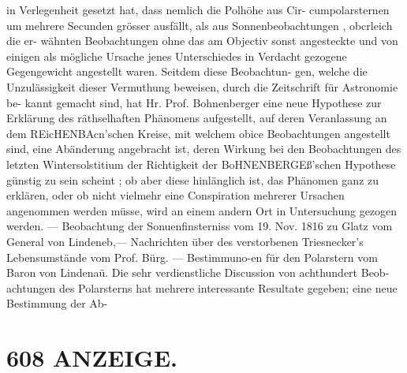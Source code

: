 \documentclass[12pt,a4paper]{article}
\begin{document}
{{{{{{{{in  Verlegenheit  gesetzt  hat,  dass  nemlich  die  Polhöhe  aus  Cir- cumpolarsternen  um  mehrere  Secunden  grösser  ausfällt,  als  aus  Sonnenbeobachtungen  ,  obcrleich  die  er- wähnten Beobachtungen  ohne  das  am  Objectiv  sonst  angesteckte  und  von  einigen  als  mögliche  Ursache jenes  Unterschiedes  in  Verdacht  gezogene  Gegengewicht  angestellt  waren.  Seitdem  diese  Beobachtun- gen, welche  die  Unzulässigkeit  dieser  Vermuthung  beweisen,  durch  die  Zeitschrift  für  Astronomie  be- kannt gemacht  sind,  hat  Hr.  Prof.  Bohnenberger  eine  neue  Hypothese  zur  Erklärung  des  räthselhaften Phänomens  aufgestellt,  auf  deren  Veranlassung  an  dem  REicHENBAcn'schen  Kreise,  mit  welchem  obice Beobachtungen  angestellt  sind,  eine  Abänderung  angebracht  ist,  deren  Wirkung  bei  den  Beobachtungen des  letzten  Wintersolstitium  der  Richtigkeit  der  BoHNENBERGEß'schen  Hypothese  günstig  zu  sein  scheint ; ob  aber  diese  hinlänglich  ist,  das  Phänomen  ganz  zu  erklären,  oder  ob  nicht  vielmehr  eine  Conspiration mehrerer  Ursachen  angenommen  werden  müsse,  wird  an  einem  andern  Ort  in  Untersuchung  gezogen werden.  ---  Beobachtung  der  Sonuenfinsterniss  vom  19.  Nov.  1816  zu  Glatz  vom  General  von  Lindeneb,--- Nachrichten  über  des  verstorbenen  Triesnecker's  Lebensumstände  vom  Prof.  Bürg.  ---  Bestimmuno-en für  den  Polarstern  vom  Baron  von  Lindenaü.  Die  sehr  verdienstliche  Discussion  von  achthundert  Beob- achtungen des  Polarsterns  hat  mehrere  interessante  Resultate  gegeben;   eine  neue  Bestimmung  der  Ab-


\section*{608  ANZEIGE.}

}}}}}}}}
\end{document}
